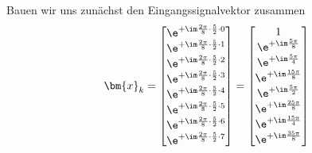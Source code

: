 %
\begin{ExCalc}
Bauen wir uns zunächst den Eingangssignalvektor zusammen
\begin{align}
\bm{x}_k =
\begin{bmatrix}
\e^{+\im \frac{2\pi}{8} \cdot \frac{5}{2} \cdot 0}\\
\e^{+\im \frac{2\pi}{8} \cdot \frac{5}{2} \cdot 1}\\
\e^{+\im \frac{2\pi}{8} \cdot \frac{5}{2} \cdot 2}\\
\e^{+\im \frac{2\pi}{8} \cdot \frac{5}{2} \cdot 3}\\
\e^{+\im \frac{2\pi}{8} \cdot \frac{5}{2} \cdot 4}\\
\e^{+\im \frac{2\pi}{8} \cdot \frac{5}{2} \cdot 5}\\
\e^{+\im \frac{2\pi}{8} \cdot \frac{5}{2} \cdot 6}\\
\e^{+\im \frac{2\pi}{8} \cdot \frac{5}{2} \cdot 7}
\end{bmatrix}
=
\begin{bmatrix}
1\\
\e^{+\im \frac{5\pi}{8}}\\
\e^{+\im \frac{5\pi}{4}}\\
\e^{+\im \frac{15\pi}{8}}\\
\e^{+\im \frac{5\pi}{2}}\\
\e^{+\im \frac{25\pi}{8}}\\
\e^{+\im \frac{15\pi}{4}}\\
\e^{+\im \frac{35\pi}{8}}
\end{bmatrix}
\end{align}



\end{ExCalc}
